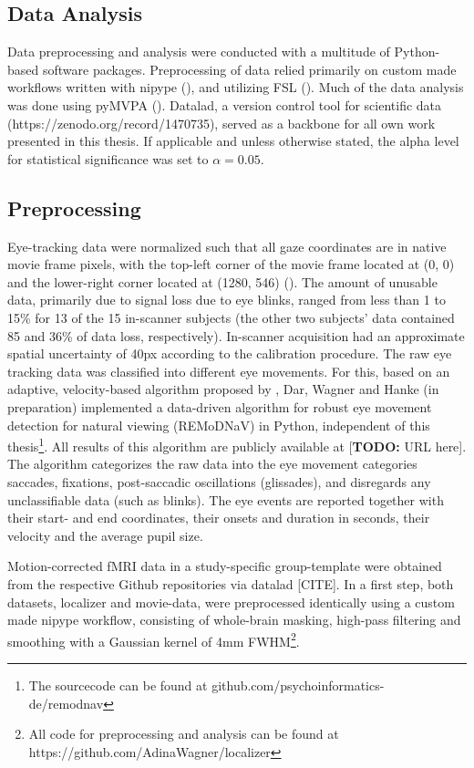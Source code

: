 \documentclass[a4paper, 12pt]{scrreprt}
\begin{document}
\subsection{Data Analysis}
Data preprocessing and analysis were conducted with a multitude of Python-based software packages. Preprocessing of data relied primarily on custom made workflows written with nipype (\cite{gorgolewski_krzysztof}), and utilizing FSL (\cite{jenkinson2012fsl}). Much of the data analysis was done using pyMVPA (\cite{hanke2009pymvpa}). Datalad, a version control tool for scientific data (https://zenodo.org/record/1470735), served as a backbone for all own work presented in this thesis. If applicable and unless otherwise stated, the alpha level for statistical significance was set to $\alpha = 0.05$.

\subsection{Preprocessing}
Eye-tracking data were normalized such that all gaze coordinates are in native movie frame pixels, with the top-left corner of the movie frame located at (0, 0) and the lower-right corner located at (1280, 546) (\cite{hanke2016studyforrest}). The amount of unusable data, primarily due to signal loss due to eye blinks, ranged from less than 1 to 15\% for 13 of the 15 in-scanner subjects (the other two subjects’ data contained 85 and 36\% of data loss, respectively). In-scanner acquisition had an approximate spatial uncertainty of 40px according to the calibration procedure. \newline
The raw eye tracking data was classified into different eye movements. For this, based on an adaptive, velocity-based algorithm proposed by \textcite{nystrom2010adaptive}, Dar, Wagner and  Hanke (in preparation) implemented a data-driven algorithm for robust eye movement detection for natural viewing (REMoDNaV) in Python, independent of this thesis\footnote{The sourcecode can be found at github.com/psychoinformatics-de/remodnav}. All results of this algorithm are publicly available at [\textbf{TODO: }URL here]. The algorithm categorizes the raw data into the eye movement categories saccades, fixations, post-saccadic oscillations (glissades), and disregards any unclassifiable data (such as blinks). The eye events are reported together with their start- and end coordinates, their onsets and duration in seconds, their velocity and the average pupil size.

Motion-corrected fMRI data in a study-specific group-template were obtained from the respective Github repositories via datalad [CITE]. In a first step, both datasets, localizer and movie-data, were preprocessed identically using a custom made nipype workflow, consisting of whole-brain masking, high-pass filtering and smoothing with a Gaussian kernel of 4mm FWHM\footnote{All code for preprocessing and analysis can be found at https://github.com/AdinaWagner/localizer}. \newline
\end{document}

